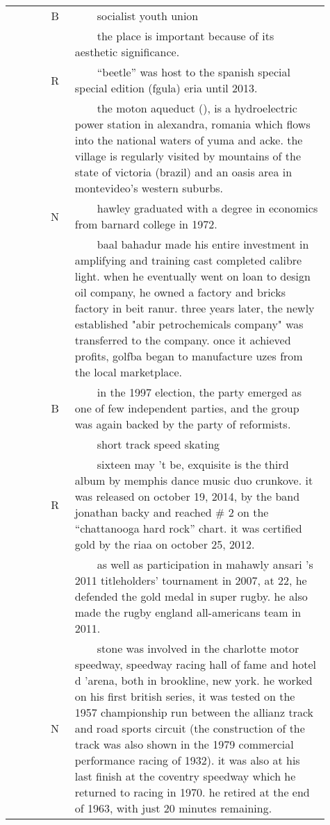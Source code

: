 \documentclass[11pt,a4paper]{article}
\newcommand{\tabitem}{~~\llap{\textbullet}~~}
\begin{document}
\begin{longtable}{ >{\footnotesize}p{0.11\linewidth}c>{\small}p{0.8\linewidth} }
 &B& \tabitem socialist youth union\\
&& \tabitem the place is important because of its aesthetic significance. \\ 
 \toprule
    \multirow{6}{*}{\bf CNN}  &R& \tabitem ``beetle'' was host to the spanish special special edition (fgula) eria until 2013. \\
&& \tabitem the moton aqueduct (), is a hydroelectric power station in alexandra, romania which flows into the national waters of yuma and acke. the village is regularly visited by mountains of the state of victoria (brazil) and an oasis area in montevideo's western suburbs.
  \\\cline{2-3}
 &N & \tabitem hawley graduated with a degree in economics from barnard college in 1972. \\
&& \tabitem baal bahadur made his entire investment in amplifying and training cast completed calibre light. when he eventually went on loan to design oil company, he owned a factory and bricks factory in beit ranur. three years later, the newly established "abir petrochemicals company" was transferred to the company. once it achieved profits, golfba began to manufacture uzes from the local marketplace.\\ \cline{2-3}
 &B& \tabitem in the 1997 election, the party emerged as one of few independent parties, and the group was again backed by the party of reformists. \\
&& \tabitem short track speed skating \\ 
    \toprule
  \multirow{6}{*}{\bf LSTM} &R&\tabitem sixteen may 't be, exquisite is the third album by memphis dance music duo crunkove. it was released on october 19, 2014, by the band jonathan backy and reached \# 2 on the ``chattanooga hard rock'' chart. it was certified gold by the riaa on october 25, 2012. \\
&& \tabitem as well as participation in mahawly ansari 's 2011 titleholders' tournament in 2007, at 22, he defended the gold medal in super rugby. he also made the rugby england all-americans team in 2011.  \\\cline{2-3}
 &N &\tabitem stone was involved in the charlotte motor speedway, speedway racing hall of fame and hotel d 'arena, both in brookline, new york. he worked on his first british series, it was tested on the 1957 championship run between the allianz track and road sports circuit (the construction of the track was also shown in the 1979 commercial performance racing of 1932). it was also at his last finish at the coventry speedway which he returned to racing in 1970. he retired at the end of 1963, with just 20 minutes remaining. \\

\end{longtable}
\end{document}
